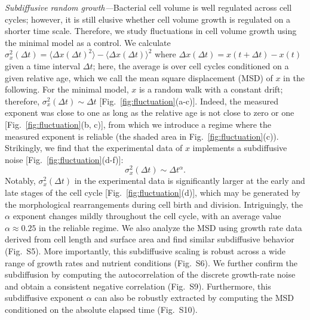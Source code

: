\documentclass[aps, prl, twocolumn, longbibliography, linenumbers, superscriptaddress]{revtex4-2}
\newcommand{\blue}{\color{blue}}
\begin{document}
{\it Subdiffusive random growth---}Bacterial cell volume is well regulated across cell cycles; however, it is still elusive whether cell volume growth is regulated on a shorter time scale. Therefore, we study fluctuations in cell volume growth using the minimal model as a control. We calculate $\sigma_x^2(\Delta t)= \langle \Delta x(\Delta t)^2\rangle- \langle \Delta x(\Delta t)\rangle^2$ where $\Delta x(\Delta t)= x(t+\Delta t)-x(t)$ given a time interval $\Delta t$; here, the average is over cell cycles conditioned on a given relative age, which we call the mean square displacement (MSD) of $x$ in the following. For the minimal model, $x$ is a random walk with a constant drift; therefore, $\sigma^2_x(\Delta t) \sim \Delta t$ [Fig.~\ref{fig:fluctuation}(a-c)]. Indeed, the measured exponent was close to one as long as the relative age is not close to zero or one [Fig.~\ref{fig:fluctuation}(b, c)], from which we introduce a regime where the measured exponent is reliable (the shaded area in Fig.~\ref{fig:fluctuation}(c)). Strikingly, we find that the experimental data of $x$ implements a subdiffusive noise [Fig.~\ref{fig:fluctuation}(d-f)]:
\begin{equation}
	\sigma^2_x (\Delta t) \sim \Delta t^{\alpha}.
	\label{eq:anomalous_exponenMukherjee2025bacterialt}
\end{equation}
Notably, $\sigma^2_x(\Delta t)$ in the experimental data is significantly larger at the early and late stages of the cell cycle [Fig.~\ref{fig:fluctuation}(d)], which may be generated by the morphological rearrangements during cell birth and division. Intriguingly, the $\alpha$ exponent changes mildly throughout the cell cycle, with an average value $\alpha\approx 0.25$ in the reliable regime. We also analyze the MSD using growth rate data derived from cell length and surface area and find similar subdiffusive behavior (Fig.~S5). More importantly, this subdiffusive scaling is robust across a wide range of growth rates and nutrient conditions (Fig.~S6). {\blue We further confirm the subdiffusion by computing the autocorrelation of the discrete growth-rate noise and obtain a consistent negative correlation (Fig.~S9). Furthermore, this subdiffusive exponent $\alpha$ can also be robustly extracted by computing the MSD conditioned on the absolute elapsed time (Fig.~S10).}
\end{document}
